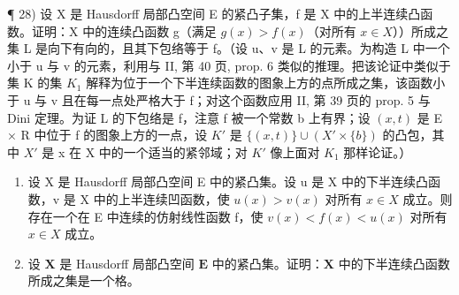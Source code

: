 ¶ 28) 设 X 是 Hausdorff 局部凸空间 E 的紧凸子集，f 是 X 中的上半连续凸函数。证明：X 中的连续凸函数 g（满足 \(g(x) > f(x)\)（对所有 \(x \in X\)））所成之集 L 是向下有向的，且其下包络等于 f。（设 u、v 是 L 的元素。为构造 L 中一个小于 u 与 v 的元素，利用与 II, 第 40 页, prop. 6 类似的推理。把该论证中类似于集 K 的集 \(K_{1}\) 解释为位于一个下半连续函数的图象上方的点所成之集，该函数小于 u 与 v 且在每一点处严格大于 f；对这个函数应用 II, 第 39 页的 prop. 5 与 Dini 定理。为证 L 的下包络是 f，注意 f 被一个常数 b 上有界；设 \((x, t)\) 是 E × R 中位于 f 的图象上方的一点，设 \(K'\) 是 \(\{(x, t)\} \cup (X' \times \{b\})\) 的凸包，其中 \(X'\) 是 x 在 X 中的一个适当的紧邻域；对 \(K'\) 像上面对 \(K_{1}\) 那样论证。）

\begin{enumerate}
\def\labelenumi{\arabic{enumi})}
\setcounter{enumi}{28}
\item
  设 X 是 Hausdorff 局部凸空间 E 中的紧凸集。设 u 是 X 中的下半连续凸函数，v 是 X 中的上半连续凹函数，使 \(u(x) > v(x)\) 对所有 \(x \in X\) 成立。则存在一个在 E 中连续的仿射线性函数 f，使 \(v(x) < f(x) < u(x)\) 对所有 \(x \in X\) 成立。
\item
  设 \(\mathbf{X}\) 是 Hausdorff 局部凸空间 \(\mathbf{E}\) 中的紧凸集。证明：\(\mathbf{X}\) 中的下半连续凸函数所成之集是一个格。
\end{enumerate}
